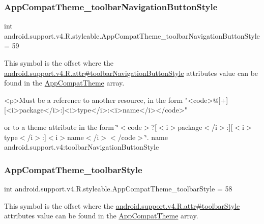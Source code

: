 \subsubsection{\texorpdfstring{App\+Compat\+Theme\+\_\+toolbar\+Navigation\+Button\+Style}{AppCompatTheme\_toolbarNavigationButtonStyle}}
{\footnotesize\ttfamily int android.\+support.\+v4.\+R.\+styleable.\+App\+Compat\+Theme\+\_\+toolbar\+Navigation\+Button\+Style = 59\hspace{0.3cm}{\ttfamily [static]}}

This symbol is the offset where the \hyperlink{classandroid_1_1support_1_1v4_1_1R_1_1attr_a930882aabfb34152191aea6412ffe683}{android.\+support.\+v4.\+R.\+attr\#toolbar\+Navigation\+Button\+Style} attribute\textquotesingle{}s value can be found in the \hyperlink{classandroid_1_1support_1_1v4_1_1R_1_1styleable_ac07ebbe62ed977f6dcaadc6397840ace}{App\+Compat\+Theme} array.

\begin{DoxyVerb}      <p>Must be a reference to another resource, in the form "<code>@[+][<i>package</i>:]<i>type</i>:<i>name</i></code>"
\end{DoxyVerb}
 or to a theme attribute in the form \char`\"{}$<$code$>$?\mbox{[}$<$i$>$package$<$/i$>$\+:\mbox{]}\mbox{[}$<$i$>$type$<$/i$>$\+:\mbox{]}$<$i$>$name$<$/i$>$$<$/code$>$\char`\"{}.  name android.\+support.\+v4\+:toolbar\+Navigation\+Button\+Style \mbox{\label{classandroid_1_1support_1_1v4_1_1R_1_1styleable_add96349c4e4f3a9c0e641cbdfe385992}} 
\subsubsection{\texorpdfstring{App\+Compat\+Theme\+\_\+toolbar\+Style}{AppCompatTheme\_toolbarStyle}}
{\footnotesize\ttfamily int android.\+support.\+v4.\+R.\+styleable.\+App\+Compat\+Theme\+\_\+toolbar\+Style = 58\hspace{0.3cm}{\ttfamily [static]}}

This symbol is the offset where the \hyperlink{classandroid_1_1support_1_1v4_1_1R_1_1attr_ab78bc91d2584ed157ab4c6f941adc567}{android.\+support.\+v4.\+R.\+attr\#toolbar\+Style} attribute\textquotesingle{}s value can be found in the \hyperlink{classandroid_1_1support_1_1v4_1_1R_1_1styleable_ac07ebbe62ed977f6dcaadc6397840ace}{App\+Compat\+Theme} array.

